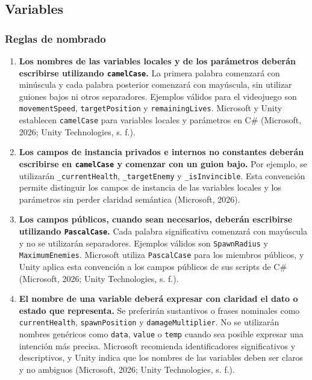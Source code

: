 \subsection{Variables}

\subsubsection{Reglas de nombrado}

\begin{enumerate}
  \item \textbf{Los nombres de las variables locales y de los parámetros deberán escribirse utilizando \texttt{camelCase}.} La primera palabra comenzará con minúscula y cada palabra posterior comenzará con mayúscula, sin utilizar guiones bajos ni otros separadores. Ejemplos válidos para el videojuego son \texttt{movementSpeed}, \texttt{targetPosition} y \texttt{remainingLives}. Microsoft y Unity establecen \texttt{camelCase} para variables locales y parámetros en C\# (Microsoft, 2026; Unity Technologies, s. f.).

  \item \textbf{Los campos de instancia privados e internos no constantes deberán escribirse en \texttt{camelCase} y comenzar con un guion bajo.} Por ejemplo, se utilizarán \texttt{\_currentHealth}, \texttt{\_targetEnemy} y \texttt{\_isInvincible}. Esta convención permite distinguir los campos de instancia de las variables locales y los parámetros sin perder claridad semántica (Microsoft, 2026).

  \item \textbf{Los campos públicos, cuando sean necesarios, deberán escribirse utilizando \texttt{PascalCase}.} Cada palabra significativa comenzará con mayúscula y no se utilizarán separadores. Ejemplos válidos son \texttt{SpawnRadius} y \texttt{MaximumEnemies}. Microsoft utiliza \texttt{PascalCase} para los miembros públicos, y Unity aplica esta convención a los campos públicos de sus scripts de C\# (Microsoft, 2026; Unity Technologies, s. f.).

  \item \textbf{El nombre de una variable deberá expresar con claridad el dato o estado que representa.} Se preferirán sustantivos o frases nominales como \texttt{currentHealth}, \texttt{spawnPosition} y \texttt{damageMultiplier}. No se utilizarán nombres genéricos como \texttt{data}, \texttt{value} o \texttt{temp} cuando sea posible expresar una intención más precisa. Microsoft recomienda identificadores significativos y descriptivos, y Unity indica que los nombres de las variables deben ser claros y no ambiguos (Microsoft, 2026; Unity Technologies, s. f.).


\end{enumerate}
